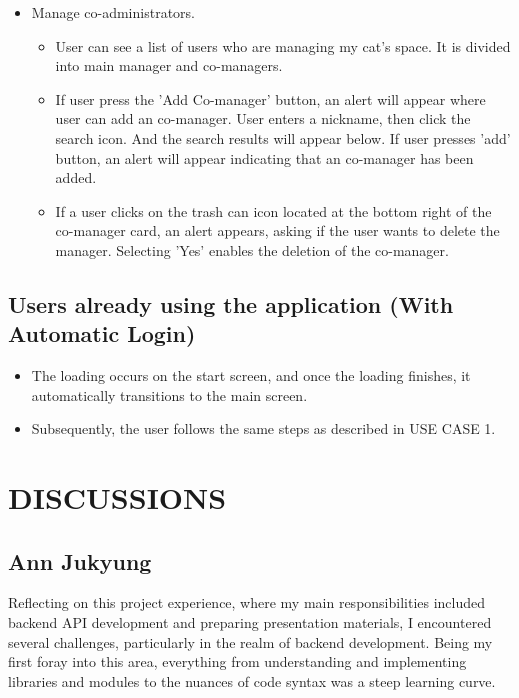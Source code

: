 \documentclass[conference]{IEEEtran}
\begin{document}
\begin{itemize}
\begin{itemize}
\begin{itemize}
            \end{itemize}
        \item Manage co-administrators.
            \begin{itemize}
                \item User can see a list of users who are managing my cat's space. It is divided into main manager and co-managers.
                \item If user press the 'Add Co-manager' button, an alert will appear where user can add an co-manager. User enters a nickname, then click the search icon. And the search results will appear below. If user presses 'add' button, an alert will appear indicating that an co-manager has been added.
                \item If a user clicks on the trash can icon located at the bottom right of the co-manager card, an alert appears, asking if the user wants to delete the manager. Selecting 'Yes' enables the deletion of the co-manager.
                \vspace{0.3cm}
            \end{itemize}
    \end{itemize}
\end{itemize}

\subsection{Users already using the application (With Automatic Login)}
\begin{itemize}
    \item The loading occurs on the start screen, and once the loading finishes, it automatically transitions to the main screen.
    \item Subsequently, the user follows the same steps as described in USE CASE 1.
\end{itemize}

\section{DISCUSSIONS}
\subsection{Ann Jukyung}
Reflecting on this project experience, where my main responsibilities included backend API development and preparing presentation materials, I encountered several challenges, particularly in the realm of backend development. Being my first foray into this area, everything from understanding and implementing libraries and modules to the nuances of code syntax was a steep learning curve.\\
\end{document}
